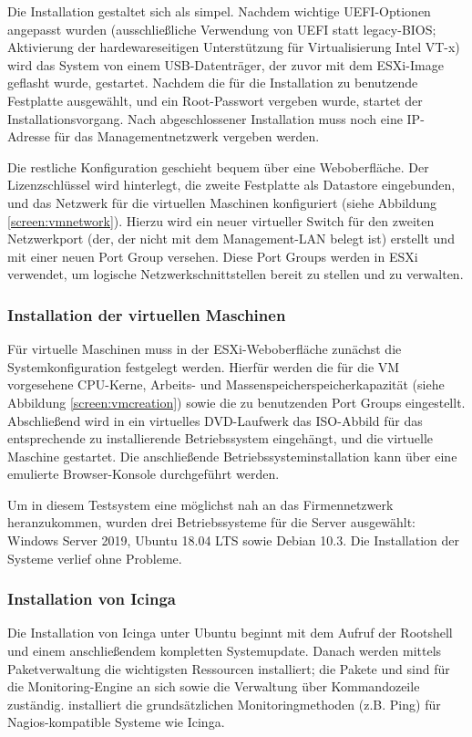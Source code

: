 Die Installation gestaltet sich als simpel. Nachdem wichtige UEFI-Optionen angepasst wurden (ausschließliche Verwendung von UEFI statt legacy-BIOS; Aktivierung der hardewareseitigen Unterstützung für Virtualisierung \glqq{}Intel VT-x\grqq{}) wird das System von einem USB-Datenträger, der zuvor mit dem \ac{ESXi}-Image geflasht wurde, gestartet. Nachdem die für die Installation zu benutzende Festplatte ausgewählt, und ein Root-Passwort vergeben wurde, startet der Installationsvorgang. Nach abgeschlossener Installation muss noch eine IP-Adresse für das Managementnetzwerk vergeben werden.

Die restliche Konfiguration geschieht bequem über eine Weboberfläche. Der Lizenzschlüssel wird hinterlegt, die zweite Festplatte als Datastore eingebunden, und das Netzwerk für die virtuellen Maschinen konfiguriert (siehe Abbildung \ref{screen:vmnetwork}). Hierzu wird ein neuer virtueller Switch für den zweiten Netzwerkport (der, der nicht mit dem Management-\ac{LAN} belegt ist) erstellt und mit einer neuen Port Group versehen. Diese Port Groups werden in \ac{ESXi} verwendet, um logische Netzwerkschnittstellen bereit zu stellen und zu verwalten. 

\subsubsection{Installation der virtuellen Maschinen}
\label{sec:InstallationVMs}
Für virtuelle Maschinen muss in der \ac{ESXi}-Weboberfläche zunächst die Systemkonfiguration festgelegt werden. Hierfür werden die für die \ac{VM} vorgesehene \ac{CPU}-Kerne, Arbeits- und Massenspeicherspeicherkapazität (siehe Abbildung \ref{screen:vmcreation}) sowie die zu benutzenden Port Groups eingestellt. Abschließend wird in ein virtuelles DVD-Laufwerk das \ac{ISO}-Abbild für das entsprechende zu installierende Betriebssystem eingehängt, und die virtuelle Maschine gestartet. Die anschließende Betriebssysteminstallation kann über eine emulierte Browser-Konsole durchgeführt werden.

Um in diesem Testsystem eine möglichst nah an das Firmennetzwerk heranzukommen, wurden drei Betriebssysteme für die Server ausgewählt: Windows Server 2019, Ubuntu 18.04 LTS sowie Debian 10.3. Die Installation der Systeme verlief ohne Probleme.

\subsubsection{Installation von \glqq{}Icinga\grqq{}}
\label{sec:InstallationIcinga}
Die Installation von \glqq{}Icinga\grqq{} unter Ubuntu beginnt mit dem Aufruf der Rootshell und einem anschließendem kompletten Systemupdate. Danach werden mittels Paketverwaltung die wichtigsten Ressourcen installiert; die Pakete  und  sind für die Monitoring-Engine an sich sowie die Verwaltung über Kommandozeile zuständig.  installiert die grundsätzlichen Monitoringmethoden (z.B. Ping) für Nagios-kompatible Systeme wie \glqq{}Icinga\grqq{}.

